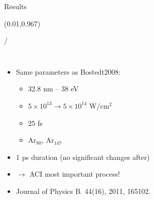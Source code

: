 \documentclass{beamer}
\makeatletter
\newcommand{\framenumber}{
\begin{textblock}{0}(0.01,0.967)
\begin{scriptsize}
{\color{gray}\insertframenumber/\inserttotalframenumber}
\end{scriptsize}
\end{textblock}
}
\makeatother
\begin{document}
\begin{frame}{Results}\framenumber


\begin{columns}
		\begin{itemize}
		\item Same parameters as Bostedt2008:
		\begin{itemize}
			\item 32.8 nm -- 38 eV
			\item $5\times10^{13} \rightarrow 5\times10^{14}$ W/cm$^2$
			\item 25 fs
			\item Ar$_{80}$, Ar$_{147}$
		\end{itemize}
		\item 1 ps duration (no significant changes after)
        \item<6-> {\color{red}$\rightarrow$ ACI most important process!}
        \item<7->{
            Journal of Physics B. 44(16), 2011, 165102.
        }
		\end{itemize}

\begin{center}


\end{center}
\end{columns}
\end{frame}
\end{document}
